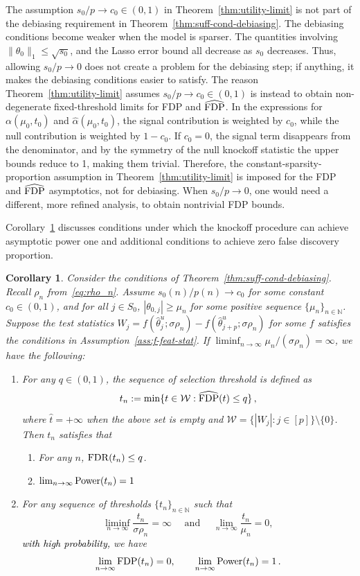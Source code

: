 \documentclass[11pt]{article}
\newtheorem{corollary}{Corollary}%
\newcommand{\FDP}{{\rm FDP}}
\newcommand{\FDR}{{\rm FDR}}
\newcommand{\Power}{{\rm Power}}
\newcommand{\hth}{\widehat{\theta}}
\newcommand{\wht}{\widehat{t}}
\begin{document}
The assumption $s_0/p \to c_0 \in (0,1)$ in Theorem~\ref{thm:utility-limit} is not part of the debiasing requirement in Theorem~\ref{thm:suff-cond-debiasing}. The debiasing conditions become weaker when the model is sparser. The quantities involving $\|\theta_0\|_1 \le \sqrt{s_0}$, and the Lasso error bound all decrease as $s_0$ decreases. Thus, allowing $s_0/p \to 0$ does not create a problem for the debiasing step; if anything, it makes the debiasing conditions easier to satisfy. The reason Theorem~\ref{thm:utility-limit} assumes $s_0/p \to c_0 \in (0,1)$ is instead to obtain non-degenerate fixed-threshold limits for FDP and $\widehat{\FDP}$. In the expressions for $\alpha(\mu_0,t_0)$ and $\widehat{\alpha}(\mu_0,t_0)$, the signal contribution is weighted by $c_0$, while the null contribution is weighted by $1-c_0$. If $c_0=0$, the signal term disappears from the denominator, and by the symmetry of the null knockoff statistic the upper bounds reduce to 1, making them trivial. Therefore, the constant-sparsity-proportion assumption in Theorem~\ref{thm:utility-limit} is imposed for the FDP and $\widehat{\FDP}$ asymptotics, not for debiasing. When $s_0/p \to 0$, one would need a different, more refined analysis, to obtain nontrivial FDP bounds.

Corollary~\ref{cor:power1} discusses conditions under which the knockoff procedure can achieve asymptotic power one and additional conditions to achieve zero false discovery proportion. 

\begin{corollary}\label{cor:power1}
Consider the conditions of Theorem~\ref{thm:suff-cond-debiasing}. Recall $\rho_n$ from~\eqref{eq:rho_n}. Assume $s_0(n)/p(n)\to c_0$ for some constant $c_0\in(0,1)$, and for all $j\in S_0$, $|\theta_{0,j}|\geq \mu_n$ for some positive sequence $\{\mu_n\}_{n\in\mathbb N}$. Suppose the test statistics $W_j = f(\hth^u_j;\sigma\rho_n)-f(\hth^u_{j+p};\sigma\rho_n)$ for some $f$ satisfies the conditions in Assumption~\ref{ass:f-feat-stat}. If $\liminf_{n\to\infty}\mu_n/(\sigma\rho_n)=\infty$, we have the following:  
\begin{enumerate}
    \item For any $q\in(0,1)$, the sequence of selection threshold is defined as 
    \[t_n:=\min\{t\in\mathcal{W}:\widehat{\FDP}(t)\le q\}\,,\] 
    where $\wht=+\infty$ when the above set is empty and $\mathcal{W}=\{|W_j|:j\in[p]\}\setminus{\{0\}}$. Then $t_n$ satisfies that 
    \begin{enumerate}
        \item For any $n$, $\FDR(t_n)\le q$.
        \item $\lim_{n\to\infty} \Power(t_n) =1$
    \end{enumerate}
    \item For any sequence of thresholds $\{t_n\}_{n\in \mathbb{N}}$ such that \[\liminf_{n\to\infty}\frac{t_n}{\sigma\rho_n} = \infty\quad \text{ and }\quad  \lim_{n\to\infty}\frac{t_n}{\mu_n}=0,\]
    \textcolor{black}{with high probability, }we have
    \[
    \lim_{n\to\infty} \FDP(t_n) =0,\quad\quad 
    \lim_{n\to\infty} \Power(t_n) =1\,.
    \]
\end{enumerate}
\end{corollary}
\end{document}
